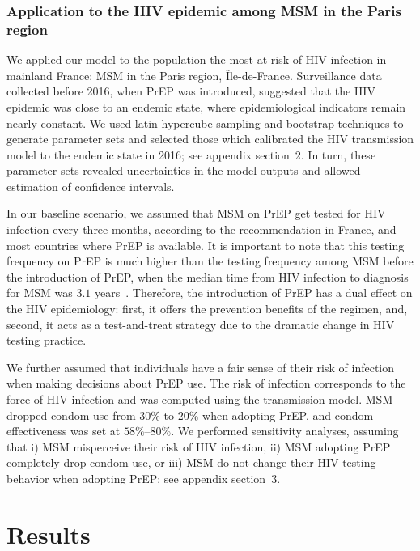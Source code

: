\documentclass[preprint,review,12pt]{article}			%
\begin{document}
\subsubsection{Application to the HIV epidemic among MSM in the Paris region} \label{subsec:Paris}

We applied our model to the population the most at risk of HIV infection in mainland France: MSM in the Paris region, \^Ile-de-France. Surveillance data collected before 2016, when PrEP was introduced, suggested that the HIV epidemic was close to an endemic state, where epidemiological indicators remain nearly constant.\cite{Marty2019,RapportSPF2019} We used latin hypercube sampling and bootstrap techniques to generate parameter sets and selected those which calibrated the HIV transmission model to the endemic state in 2016;\cite{Marty2019} see appendix section~2. In turn, these parameter sets revealed uncertainties in the model outputs and allowed estimation of confidence intervals.

In our baseline scenario, we assumed that MSM on PrEP get tested for HIV infection every three months, according to the recommendation in France,\cite{CNSANRS2018} and most countries where PrEP is available. It is important to note that this testing frequency on PrEP is much higher than the testing frequency among MSM before the introduction of PrEP, when the median time from HIV infection to diagnosis for MSM was $3.1$ years~\cite{Marty2019}. Therefore, the introduction of PrEP has a dual effect on the HIV epidemiology: first, it offers the prevention benefits of the regimen, and, second, it acts as a test-and-treat strategy\cite{Kretzschmar2013,WHO2016} due to the dramatic change in HIV testing practice. 

We further assumed that individuals have a fair sense of their risk of infection when making decisions about PrEP use. The risk of infection corresponds to the force of HIV infection and was computed using the transmission model. MSM dropped condom use from $30\%$ to $20\%$ when adopting PrEP,\cite{Molina2015} and condom effectiveness was set at $58\%$--$80\%$.\cite{Smith2015} We performed sensitivity analyses, assuming that i) MSM misperceive their risk of HIV infection, ii) MSM adopting PrEP completely drop condom use, or iii) MSM do not change their HIV testing behavior when adopting PrEP; see appendix section~3. 

\section{Results} \label{sec:Results}
\end{document}
